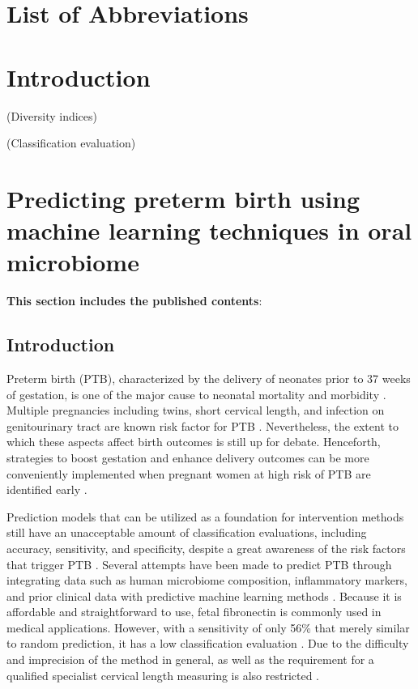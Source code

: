 \documentclass[11pt, a4paper, onecolumn, oneside]{report}
\begin{document}
\listoffigures{}
\thispagestyle{empty}
\clearpage

\listoftables{}
\thispagestyle{empty}
\clearpage

\setcounter{page}{1}

    \section*{\centering List of Abbreviations}
    \printacronyms[display=all, heading=none]
    \newpage

    \section{Introduction}
        (Diversity indices)

        (Classification evaluation)
    \newpage

    \section{Predicting preterm birth using machine learning techniques in oral microbiome}
        \label{section:PTB}

        \textbf{This section includes the published contents}: \\
         \nocite{PTB-JW-1}

        \subsection{Introduction}
            Preterm birth (PTB), characterized by the delivery of neonates prior to 37 weeks of gestation, is one of the major cause to neonatal mortality and morbidity \cite{PTB-rate-1}. Multiple pregnancies including twins, short cervical length, and infection on genitourinary tract are known risk factor for PTB \cite{PTB-cause-1}. Nevertheless, the extent to which these aspects affect birth outcomes is still up for debate. Henceforth, strategies to boost gestation and enhance delivery outcomes can be more conveniently implemented when pregnant women at high risk of PTB are identified early \cite{PTB-care-1}.

            Prediction models that can be utilized as a foundation for intervention methods still have an unacceptable amount of classification evaluations, including accuracy, sensitivity, and specificity, despite a great awareness of the risk factors that trigger PTB \cite{PTB-prediction-1}. Several attempts have been made to predict PTB through integrating data such as human microbiome composition, inflammatory markers, and prior clinical data with predictive machine learning methods \cite{PTB-prediction-2}. Because it is affordable and straightforward to use, fetal fibronectin is commonly used in medical applications. However, with a sensitivity of only 56\% that merely similar to random prediction, it has a low classification evaluation \cite{PTB-prediction-3}. Due to the difficulty and imprecision of the method in general, as well as the requirement for a qualified specialist cervical length measuring is also restricted \cite{PTB-prediction-4}.
\end{document}
